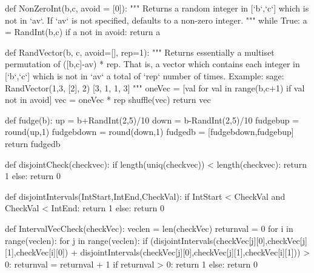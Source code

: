 \begin{sagesilent}
def NonZeroInt(b,c, avoid = [0]):
    """ Returns a random integer in [`b`,`c`] which is not in `av`. 
        If `av` is not specified, defaults to a non-zero integer.
    """
    while True:
        a = RandInt(b,c)
        if a not in avoid:
            return a

def RandVector(b, c, avoid=[], rep=1):
    """ Returns essentially a multiset permutation of ([b,c]-av) * rep.
        That is, a vector which contains each integer in [`b`,`c`] which is not in `av` a total of `rep` number of times.
        Example:
        sage: RandVector(1,3, [2], 2)
        [3, 1, 1, 3]
    """
    oneVec = [val for val in range(b,c+1) if val not in avoid]
    vec = oneVec * rep
    shuffle(vec)
    return vec

def fudge(b):
    up = b+RandInt(2,5)/10
    down = b-RandInt(2,5)/10
    fudgebup = round(up,1)
    fudgebdown = round(down,1)
    fudgedb = [fudgebdown,fudgebup]
    return fudgedb

def disjointCheck(checkvec):
    if length(uniq(checkvec)) < length(checkvec):
        return 1
    else:
        return 0

def disjointIntervals(IntStart,IntEnd,CheckVal):
    if IntStart < CheckVal and CheckVal < IntEnd:
        return 1
    else:
        return 0

def IntervalVecCheck(checkVec):
    veclen = len(checkVec)
    returnval = 0
    for i in range(veclen):
        for j in range(veclen):
            if (disjointIntervals(checkVec[j][0],checkVec[j][1],checkVec[i][0]) + disjointIntervals(checkVec[j][0],checkVec[j][1],checkVec[i][1])) > 0:
                returnval = returnval + 1
    if returnval > 0:
        return 1
    else:
        return 0



\end{sagesilent}